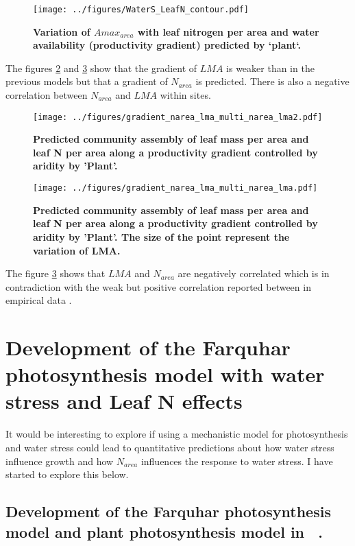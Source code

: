 \documentclass[a4paper,11pt]{article}
\begin{document}
\begin{figure}[ht]
\centering
\texttt{[image: ../figures/WaterS\_LeafN\_contour.pdf]}
\caption{\textbf{Variation of $A{max}_{area}$ with leaf nitrogen per area and water availability (productivity gradient) predicted by `plant`.}
\label{fig:leafN_water}}
\end{figure}

The figures \ref{fig:lma_narea1} and \ref{fig:lma_narea2} show that
the gradient of $LMA$ is weaker than in the previous models but that a gradient of $N_{area}$ is predicted. There is also a negative correlation between $N_{area}$ and $LMA$ within sites.

\begin{figure}[ht]
\centering
\texttt{[image: ../figures/gradient\_narea\_lma\_multi\_narea\_lma2.pdf]}
\caption{\textbf{Predicted community assembly of leaf mass per area and leaf N per area along a productivity gradient controlled by aridity by 'Plant'.}
\label{fig:lma_narea1}}
\end{figure}

\begin{figure}[ht]
\centering
\texttt{[image: ../figures/gradient\_narea\_lma\_multi\_narea\_lma.pdf]}
\caption{\textbf{Predicted community assembly of leaf mass per area and leaf N per area along a productivity gradient controlled by aridity by 'Plant'. The size of the point represent the variation of LMA.}
\label{fig:lma_narea2}}
\end{figure}

The figure \ref{fig:lma_narea2} shows that $LMA$ and $N_{area}$ are negatively correlated which is in contradiction with the weak but positive correlation reported between in empirical data \citep{Wright-2004}.


\clearpage

\section{Development of the Farquhar photosynthesis model with water stress and Leaf N effects}


It would be interesting to explore if using a mechanistic model for
photosynthesis and water stress could lead to quantitative predictions
about how water stress influence growth and how $N_{area}$ influences the response to water stress. I have started to explore this below.


\subsection{Development of the Farquhar photosynthesis model and plant photosynthesis model in \plant\ .}
\end{document}
